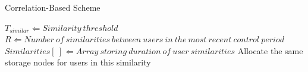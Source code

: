 \begin{algorithm}[!htbp]
\caption{Correlation-Based Scheme}
\label{corrapp}
\begin{algorithmic}[1]
    \STATE $T_{similar} \Leftarrow Similarity\ threshold$
    \STATE $R \Leftarrow Number\ of\ similarities\ between\ users\ in\ the\ most\ recent\ control\ period$
    \STATE $Similarities[\ ] \Leftarrow Array\ storing\ duration\ of\ user\ similarities$
            \STATE Allocate the same storage nodes for users in this similarity
        \ENDIF
    \ENDFOR
\end{algorithmic}
\end{algorithm}

